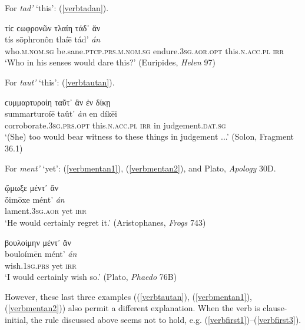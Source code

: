 For \emph{tad'} `this': (\ref{verbtadan}).

\begin{exe}
\ex τίϲ ϲωφρονῶν τλαίη τάδ᾽ ἄν\\
\gll tís sōphronôn tlaíē tád' \emph{án}\\
who.\textsc{m.nom.sg} be.sane.\textsc{ptcp.prs.m.nom.sg} endure.\textsc{3sg.aor.opt} this.\textsc{n.acc.pl} \textsc{irr}\\
\trans `Who in his senses would dare this?' (Euripides, \textit{Helen} 97)
\label{verbtadan}
\end{exe}

For \emph{taut'} `this': (\ref{verbtautan}).

\begin{exe}
\ex ϲυμμαρτυροίη ταῦτ᾽ ἂν ἐν δίκῃ\\
\gll summarturoíē taût' \emph{àn} en díkēi\\
corroborate.\textsc{3sg.prs.opt} this.\textsc{n.acc.pl} \textsc{irr} in judgement.\textsc{dat.sg}\\
\trans `(She) too would bear witness to these things in judgement ...' (Solon, Fragment 36.1)
\label{verbtautan}
\end{exe}

For \emph{ment'} `yet': (\ref{verbmentan1}), (\ref{verbmentan2}), and Plato, \textit{Apology} 30D.

\begin{exe}
\ex ᾤμωξε μέντ᾽ ἄν\\
\gll ṓimōxe mént' \emph{án}\\
lament.\textsc{3sg.aor} yet \textsc{irr}\\
\trans `He would certainly regret it.' (Aristophanes, \textit{Frogs} 743)
\label{verbmentan1}
\end{exe}

\begin{exe}
\ex βουλοίμην μέντ᾽ ἄν\\
\gll bouloímēn mént' \emph{án}\\
wish.\textsc{1sg.prs} yet \textsc{irr}\\
\trans `I would certainly wish so.' (Plato, \textit{Phaedo} 76B)
\label{verbmentan2}
\end{exe}

However, these last three examples ((\ref{verbtautan}), (\ref{verbmentan1}), (\ref{verbmentan2})) also permit a different explanation. When the verb is clause-initial, the rule discussed above seems not to hold, e.g. (\ref{verbfirst1})--(\ref{verbfirst3}).

